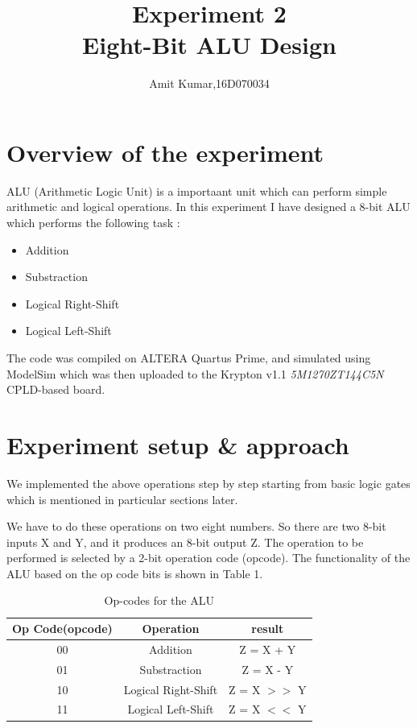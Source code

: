 \documentclass[12pt]{article}
\title{Experiment 2\\ Eight-Bit ALU Design}
\author{Amit Kumar,16D070034}
\begin{document}
\maketitle

\section{Overview of the experiment}

ALU (Arithmetic Logic Unit) is a importaant unit which can perform simple arithmetic and logical operations. In this experiment I have designed a 8-bit ALU which performs the following task :\\
\begin{itemize}
\item Addition
\item Substraction
\item Logical Right-Shift
\item Logical Left-Shift
\end{itemize}
The code was compiled on ALTERA Quartus Prime, and simulated using ModelSim which was then uploaded to the Krypton v1.1 \textit{5M1270ZT144C5N} CPLD-based board.



\section{Experiment setup \& approach}

We implemented the above operations step by step starting from basic logic gates which is mentioned in particular sections later.

We have to do these operations on two eight numbers. So there are two 8-bit inputs X and Y, and it produces an 8-bit output Z. The operation to be
performed is selected by a 2-bit operation code (opcode). The functionality
of the ALU based on the op code bits is shown in Table 1.

\begin{table}[H]
\centering
\begin{tabular}{| c | c | c |}
\hline
Op Code(opcode) & Operation & result \\
\hline
00 & Addition & Z = X + Y \\
01 & Substraction & Z = X - Y \\
10 & Logical Right-Shift & Z = X $>>$ Y \\
11 & Logical Left-Shift & Z = X $<<$ Y \\
\hline
\end{tabular}
\caption{Op-codes for the ALU}
\end{table}
\end{document}
